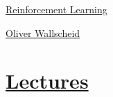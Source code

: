 \documentclass[11pt]{article}
\begin{document}
	\kaishu 
	\setcounter{section}{0}
	\begin{center}
		{\LARGE  \href{https://github.com/upb-lea/reinforcement_learning_course_materials}{Reinforcement Learning}}
		
		
		{\large \href{https://github.com/wallscheid}{Oliver Wallscheid}}
	\end{center}
\setcounter{page}{1}

\vspace{-1cm}

\section{\href{https://www.youtube.com/playlist?list=PL4GzQQuIDBGsvkrltNwIkHuGQIENvYtLV}{Lectures}}

\vspace{-0.5cm}
\end{document}
